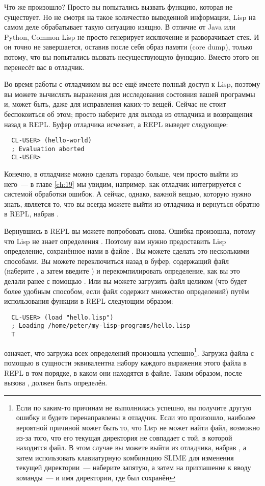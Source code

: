 Что же произошло? Просто вы попытались вызвать функцию, которая не существует. Но не
смотря на такое количество выведенной информации, Lisp на самом деле обрабатывает такую
ситуацию изящно. В отличие от Java или Python, Common Lisp не просто генерирует исключение
и разворачивает стек. И он точно не завершается, оставив после себя образ памяти (core
dump), только потому, что вы попытались вызвать несуществующую функцию. Вместо этого он
перенесёт вас в отладчик.

Во время работы с отладчиком вы все ещё имеете полный доступ к Lisp, поэтому вы можете
вычислять выражения для исследования состояния вашей программы и, может быть, даже для
исправления каких-то вещей. Сейчас не стоит беспокоиться об этом; просто наберите  для
выхода из отладчика и возвращения назад в REPL. Буфер отладчика исчезнет, а REPL выведет
следующее:

\begin{verbatim}
  CL-USER> (hello-world) 
  ; Evaluation aborted
  CL-USER>
\end{verbatim}

Конечно, в отладчике можно сделать гораздо больше, чем просто выйти из него~--- в главе
\ref{ch:19} мы увидим, например, как отладчик интегрируется с системой обработки ошибок.
А сейчас, однако, важной вещью, которую нужно знать, является то, что вы всегда можете
выйти из отладчика и вернуться обратно в REPL, набрав .

Вернувшись в REPL вы можете попробовать снова. Ошибка произошла, потому что Lisp не знает
определения . Поэтому вам нужно предоставить Lisp определение, сохранённое нами
в файле . Вы можете сделать это несколькими способами. Вы можете переключиться
назад в буфер, содержащий файл (наберите , а затем введите ) и
перекомпилировать определение, как вы это делали ранее с помощью . Или вы можете
загрузить файл целиком (что будет более удобным способом, если файл содержит множество
определений) путём использования функции  в REPL следующим образом:

\begin{verbatim}
  CL-USER> (load "hello.lisp")
  ; Loading /home/peter/my-lisp-programs/hello.lisp
  T
\end{verbatim}

 означает, что загрузка всех определений произошла успешно\footnote{Если по каким-то
  причинам  не выполнилась успешно, вы получите другую ошибку и будете перенаправлены
  в отладчик. Если это произошло, наиболее вероятной причиной может быть то, что Lisp не
  может найти файл, возможно из-за того, что его текущая директория не совпадает с той, в
  которой находится файл. В этом случае вы можете выйти из отладчика, набрав , а затем
  использовать клавиатурную комбинацию SLIME  для изменения текущей директории~---
  наберите запятую, а затем на приглашение к вводу команды~---  и имя директории, где был
  сохранён }. Загрузка файла с помощью  в сущности эквивалентна набору
каждого выражения этого файла в REPL в том порядке, в каком они находятся в файле. Таким
образом, после вызова ,  должен быть определён.

